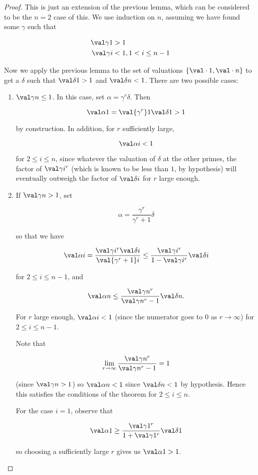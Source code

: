 \begin{proof}
  This is just an extension of the previous lemma, which can be considered to be
  the $n=2$ case of this. We use induction on $n$, assuming we have found some
  $\gamma$ such that

  \begin{align*}
    \val \gamma 1 &> 1\\
    \val \gamma i &< 1, 1 < i \leq n - 1
  \end{align*}

  Now we apply the previous lemma to the set of valuations $\{ \val \cdot 1,
  \val \cdot n \}$ to get a $\delta$ such that $\val \delta 1 > 1$ and $\val
  \delta n < 1$. There are two possible cases:
  \begin{enumerate}
  \item $\val \gamma n \leq 1$. In this case, set $\alpha = \gamma^r \delta$.
    Then

    \[ \val \alpha 1 = \val {\gamma^r} 1 \val \delta 1 > 1 \]

    by construction. In addition, for $r$ sufficiently large,

    \[ \val \alpha i < 1 \]

    for $2\leq i \leq n$, since whatever the valuation of $\delta$ at the other
    primes, the factor of $\val \gamma i ^r$ (which is known to be less than
    $1$, by hypothesis) will eventually outweigh the factor of $\val \delta i$
    for $r$ large enough.

  \item If $\val \gamma n > 1$, set

    \[ \alpha = \frac{\gamma^r}{\gamma^r + 1} \delta \]

    so that we have

    \[ \val \alpha i = \frac{\val \gamma i ^r \val \delta i}{\val {\gamma^r + 1}
        i} \leq \frac {\val \gamma i ^r} {1 - \val \gamma i ^r} \val \delta i
    \]

    for $2 \leq i \leq n - 1$, and

    \[
      \val \alpha n \leq \frac{\val \gamma n ^r} {\val \gamma n ^r - 1} \val
      \delta n.
    \]

    For $r$ large enough, $\val \alpha i < 1$ (since the numerator goes to $0$
    as $r\to\infty$) for $2\leq i\leq n-1$.

    Note that

    \[ \lim_{r\to\infty} \frac{\val \gamma n ^r} {\val \gamma n ^r - 1} = 1 \]

    (since $\val \gamma n > 1$) so $\val \alpha n < 1$ since $\val \delta n < 1$
    by hypothesis. Hence this satisfies the conditions of the theorem for $2\leq
    i \leq n$.

    For the case $i = 1$, observe that

    \[ \val \alpha 1 \geq \frac {\val \gamma 1 ^r} {1 + \val \gamma 1 ^r} \val
      \delta 1 \]

    so choosing a sufficiently large $r$ gives us $\val \alpha 1 > 1$.

  \end{enumerate}
\end{proof}


